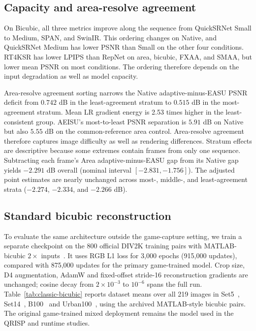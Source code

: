 \documentclass[10pt,twocolumn,letterpaper]{article}
\newcommand{\model}{AEISU}
\begin{document}
\subsection{Capacity and area-resolve agreement}
On Bicubic, all three metrics improve along the sequence from QuickSRNet Small to Medium, SPAN, and SwinIR.
This ordering changes on Native, and QuickSRNet Medium has lower PSNR than Small on the other four conditions.
RT4KSR has lower LPIPS than RepNet on area, bicubic, FXAA, and SMAA, but lower mean PSNR on most conditions.
The ordering therefore depends on the input degradation as well as model capacity.

Area-resolve agreement sorting narrows the Native adaptive-minus-EASU PSNR deficit from $0.742$ dB in the least-agreement stratum to $0.515$ dB in the most-agreement stratum.
Mean LR gradient energy is 2.53 times higher in the least-consistent group.
\model{}'s most-to-least PSNR separation is $5.91$ dB on Native but also $5.55$ dB on the common-reference area control.
Area-resolve agreement therefore captures image difficulty as well as rendering differences.
Stratum effects are descriptive because some extremes contain frames from only one sequence.
Subtracting each frame's Area adaptive-minus-EASU gap from its Native gap yields $-2.291$ dB overall (nominal interval $[-2.831,-1.756]$).
The adjusted point estimates are nearly unchanged across most-, middle-, and least-agreement strata ($-2.274$, $-2.334$, and $-2.266$ dB).

\subsection{Standard bicubic reconstruction}
\label{sec:classic-bicubic}
To evaluate the same architecture outside the game-capture setting, we train a separate checkpoint on the 800 official DIV2K training pairs with MATLAB-bicubic $2\times$ inputs~\cite{agustsson2017div2k}.
It uses RGB L1 loss for 3,000 epochs (915,000 updates), compared with 875,000 updates for the primary game-trained model.
Crop size, D4 augmentation, AdamW and fixed-offset stride-16 reconstruction gradients are unchanged; cosine decay from $2\times10^{-3}$ to $10^{-6}$ spans the full run.
Table~\ref{tab:classic-bicubic} reports dataset means over all 219 images in Set5~\cite{bevilacqua2012set5}, Set14~\cite{zeyde2011set14}, B100~\cite{martin2001bsd} and Urban100~\cite{huang2015urban100}, using the archived MATLAB-style bicubic pairs.
The original game-trained mixed deployment remains the model used in the QRISP and runtime studies.
\end{document}
